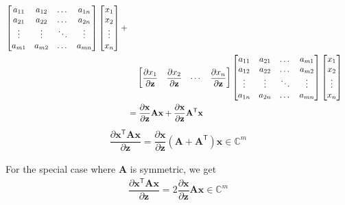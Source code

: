 \documentclass{article}
\newcommand{\trans}{\mathsf{T}}
\begin{document}
\begin{align}
\begin{bmatrix}
        a_{11} & a_{12} & \dots & a_{1n} \\
        a_{21} & a_{22} & \dots & a_{2n} \\
        \vdots & \vdots & \ddots & \vdots \\
        a_{m1} & a_{m2} & \dots & a_{mn} \\
    \end{bmatrix}
    \begin{bmatrix}
        x_{1} \\ x_{2} \\ \vdots \\ x_{n}
    \end{bmatrix} + \nonumber \\
    & \hspace{2.5ex} \begin{bmatrix}
        \dfrac{\partial x_{1}}{\partial \mathbf{z}} & \dfrac{\partial x_{2}}{\partial \mathbf{z}} & \cdots  & \dfrac{\partial x_{n}}{\partial \mathbf{z}}
     \end{bmatrix}
     \begin{bmatrix}
         a_{11} & a_{21} & \dots & a_{m1} \\
         a_{12} & a_{22} & \dots & a_{m2} \\
         \vdots & \vdots & \ddots & \vdots \\
         a_{1n} & a_{2n} & \dots & a_{mn} \\
     \end{bmatrix}
     \begin{bmatrix}
         x_{1} \\ x_{2} \\ \vdots \\ x_{n}
     \end{bmatrix} \\
     & = \dfrac{\partial \mathbf{x}}{\partial \mathbf{z}}\mathbf{A} \mathbf{x} + \dfrac{\partial \mathbf{x}}{\partial \mathbf{z}}\mathbf{A}^\trans \mathbf{x}
\end{align}
\begin{align}
    \boxed{\dfrac{\partial \mathbf{x}^\trans \mathbf{A} \mathbf{x}}{\partial \mathbf{z}} = \dfrac{\partial \mathbf{x}}{\partial \mathbf{z}}\left( \mathbf{A} + \mathbf{A}^\trans \right) \mathbf{x} \in \mathbb{C}^{m}}
\end{align}

For the special case where \(\mathbf{A}\) is symmetric, we get
\begin{align}
    \boxed{\dfrac{\partial \mathbf{x}^\trans \mathbf{A} \mathbf{x}}{\partial \mathbf{z}} = 2\dfrac{\partial \mathbf{x}}{\partial \mathbf{z}}\mathbf{A} \mathbf{x} \in \mathbb{C}^{m}}
\end{align}
\end{document}
